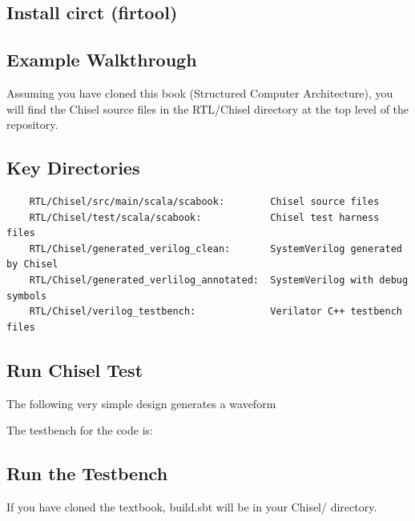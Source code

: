 \subsection{Install circt (firtool)}

\subsection{Example Walkthrough}
Assuming you have cloned this book (Structured Computer Architecture), you will find the Chisel source files in the RTL/Chisel directory at the top level of the repository.

\subsection{Key Directories}
\begin{verbatim}
    RTL/Chisel/src/main/scala/scabook:        Chisel source files
    RTL/Chisel/test/scala/scabook:            Chisel test harness files
    RTL/Chisel/generated_verilog_clean:       SystemVerilog generated by Chisel 
    RTL/Chisel/generated_verlilog_annotated:  SystemVerilog with debug symbols
    RTL/Chisel/verilog_testbench:             Verilator C++ testbench files
\end{verbatim}

\subsection{Run Chisel Test}
The following very simple design generates a waveform

The testbench for the code is:

\subsection{Run the Testbench}
If you have cloned the textbook, build.sbt will be in your Chisel/ directory.

